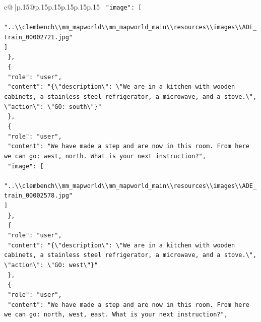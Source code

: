 \documentclass{article}
\begin{document}
{\begin{supertabular}{c@{$\;$}|p{.15\linewidth}@{}p{.15\linewidth}p{.15\linewidth}p{.15\linewidth}p{.15\linewidth}p{.15\linewidth}}
{{{\texttt{    "image": {[}} \\
\texttt{      "..\textbackslash{}\textbackslash{}clembench\textbackslash{}\textbackslash{}mm\_mapworld\textbackslash{}\textbackslash{}mm\_mapworld\_main\textbackslash{}\textbackslash{}resources\textbackslash{}\textbackslash{}images\textbackslash{}\textbackslash{}ADE\_train\_00002721.jpg"} \\
\texttt{    {]}} \\
\texttt{  \},} \\
\texttt{  \{} \\
\texttt{    "role": "user",} \\
\texttt{    "content": "\{\textbackslash{}"description\textbackslash{}": \textbackslash{}"We are in a kitchen with wooden cabinets, a stainless steel refrigerator, a microwave, and a stove.\textbackslash{}", \textbackslash{}"action\textbackslash{}": \textbackslash{}"GO: south\textbackslash{}"\}"} \\
\texttt{  \},} \\
\texttt{  \{} \\
\texttt{    "role": "user",} \\
\texttt{    "content": "We have made a step and are now in this room. From here we can go: west, north. What is your next instruction?",} \\
\texttt{    "image": {[}} \\
\texttt{      "..\textbackslash{}\textbackslash{}clembench\textbackslash{}\textbackslash{}mm\_mapworld\textbackslash{}\textbackslash{}mm\_mapworld\_main\textbackslash{}\textbackslash{}resources\textbackslash{}\textbackslash{}images\textbackslash{}\textbackslash{}ADE\_train\_00002578.jpg"} \\
\texttt{    {]}} \\
\texttt{  \},} \\
\texttt{  \{} \\
\texttt{    "role": "user",} \\
\texttt{    "content": "\{\textbackslash{}"description\textbackslash{}": \textbackslash{}"We are in a kitchen with wooden cabinets, a stainless steel refrigerator, a microwave, and a stove.\textbackslash{}", \textbackslash{}"action\textbackslash{}": \textbackslash{}"GO: west\textbackslash{}"\}"} \\
\texttt{  \},} \\
\texttt{  \{} \\
\texttt{    "role": "user",} \\
\texttt{    "content": "We have made a step and are now in this room. From here we can go: north, west, east. What is your next instruction?",} \\
}}}
\end{supertabular}}
\end{document}
